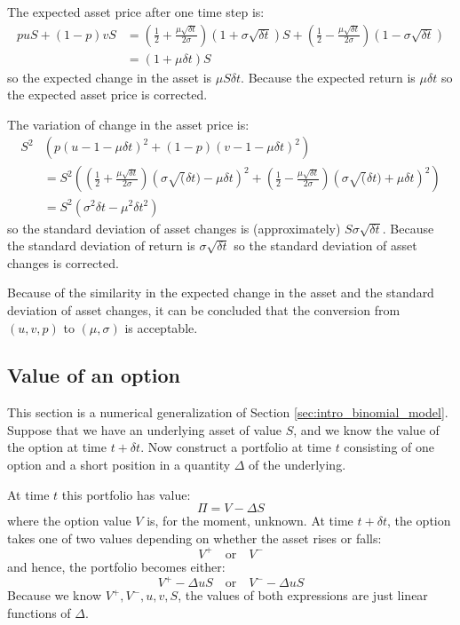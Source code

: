 The expected asset price after one time step is:
\begin{align}
    p u S + (1-p) v S &= \left( \frac{1}{2} + \frac{\mu \sqrt{\delta t}}{2 \sigma} \right) \left( 1 + \sigma \sqrt{\delta t} \right) S + \left( \frac{1}{2} - \frac{\mu \sqrt{\delta t}}{2 \sigma} \right) \left( 1 - \sigma \sqrt{\delta t} \right) \\
                      &= \left( 1 + \mu \delta t \right) S
\end{align}
so the expected change in the asset is $\mu S \delta t$. Because the expected return is $\mu \delta t$ so the expected asset price is corrected.

The variation of change in the asset price is:
\begin{align}
    S^2 &\left( p(u - 1 - \mu \delta t)^2 + (1-p)(v - 1 - \mu \delta t)^2 \right) \\
     &= S^2 \left( \left( \frac{1}{2} + \frac{\mu \sqrt{\delta t}}{2 \sigma} \right) \left( \sigma \sqrt(\delta t) - \mu \delta t \right)^2 + \left( \frac{1}{2} - \frac{\mu \sqrt{\delta t}}{2 \sigma} \right) \left( \sigma \sqrt(\delta t) + \mu \delta t \right)^2 \right) \\
     &= S^2 \left( \sigma^2 \delta t - \mu^2 \delta t^2 \right)
\end{align}
so the standard deviation of asset changes is (approximately) $S \sigma \sqrt{\delta t}$. Because the standard deviation of return is $\sigma \sqrt{\delta t}$ so the standard deviation of asset changes is corrected.

Because of the similarity in the expected change in the asset and the standard deviation of asset changes, it can be concluded that the conversion from $(u,v,p)$ to $(\mu,\sigma)$ is acceptable.



\subsection{Value of an option}
This section is a numerical generalization of Section \ref{sec:intro_binomial_model}. Suppose that we have an underlying asset of value $S$, and we know the value of the option at time $t + \delta t$. Now construct a portfolio at time $t$ consisting of one option and a short position in a quantity $\Delta$ of the underlying. 

At time $t$ this portfolio has value:
\begin{equation}
    \Pi = V - \Delta S
\end{equation}
where the option value $V$ is, for the moment, unknown. At time $t + \delta t$, the option takes one of two values depending on whether the asset rises or falls:
\begin{equation}
    V^+ \quad \text{or} \quad V^-
\end{equation}
and hence, the portfolio becomes either:
\begin{equation}
    V^+ - \Delta u S \quad \text{or} \quad V^- - \Delta u S
\end{equation}
Because we know $V^+, V^-, u, v, S$, the values of both expressions are just linear functions of $\Delta$.



